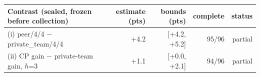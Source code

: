 \begin{tabular}{lrrrr}
\toprule
Contrast (sealed, frozen before collection) & estimate (pts) & bounds (pts) & complete & status \\ \midrule
(i) peer/4/4 $-$ private\_team/4/4 & +4.2 & [+4.2, +5.2] & 95/96 & partial \\
(ii) CP gain $-$ private-team gain, $h$=3 & +1.1 & [+0.0, +2.1] & 94/96 & partial \\
\bottomrule
\end{tabular}
